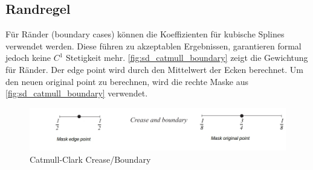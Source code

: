 \subsection{Randregel}

Für Ränder (boundary cases) können die Koeffizienten für kubische Splines verwendet werden.
Diese führen zu akzeptablen Ergebnissen, garantieren formal jedoch keine \(C^1\) Stetigkeit mehr. \cite[S. 75f]{Zorin.subdivcourse}
\autoref{fig:sd_catmull_boundary} zeigt die Gewichtung für Ränder.
Der edge point wird durch den Mittelwert der Ecken berechnet.
Um den neuen original point zu berechnen, wird die rechte Maske aus \autoref{fig:sd_catmull_boundary}
verwendet.

\begin{figure}
\centering
\includegraphics[width=1.0\textwidth]{content/media/sd_catmull_boundary.jpg}
\caption{Catmull-Clark Crease/Boundary \cite[S. 76]{Zorin.subdivcourse}}
\label{fig:sd_catmull_boundary}
\end{figure}



